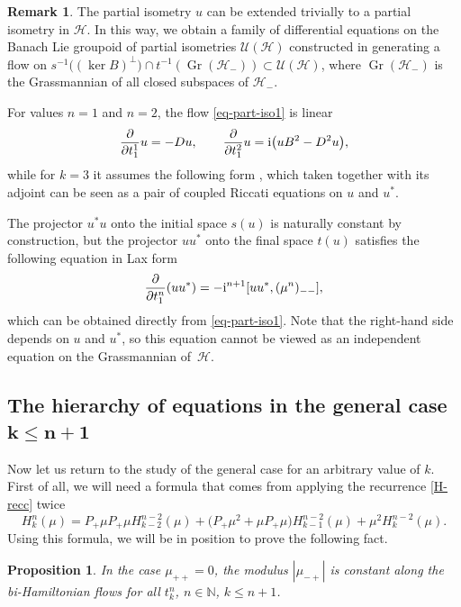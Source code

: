 \documentclass[10pt,a4paper]{amsart}
\newtheorem{prop}[thm]{Proposition}
\theoremstyle{definition}
\newtheorem{rem}[thm]{Remark}
\numberwithin{equation}{section}
\newcommand{\N}{\mathbb N}
\renewcommand{\H}{\mathcal{H}}
\newcommand{\UU}{\mathcal U(\H)}
\newcommand{\abs}[1]{\left\vert#1\right\vert}
\newcommand{\be}{\begin{equation}}
\newcommand{\ee}{\end{equation}}
\begin{document}
\begin{rem}
 The partial isometry $u$ can be extended trivially to a partial isometry in $\H$. In this way, we obtain a family of differential equations on the Banach Lie groupoid of partial isometries $\UU$ constructed in \cite{OS} generating a flow on
$s^{-1}\bigl((\ker B)^\perp\bigr)\cap t^{-1}(\operatorname{Gr}(\H_-))\subset \UU$, where $\operatorname{Gr}(\H_-)$ is the Grassmannian of all closed subspaces of $\H_-$.
\end{rem}
For values $n=1$ and $n=2$, the flow \eqref{eq-part-iso1} is linear
\begin{gather*} \frac\partial{\partial t^1_1} u = -Du,\qquad
\frac\partial{\partial t^2_1} u = {\rm i}\bigl(uB^2-D^2u\bigr),
\end{gather*}
while for $k=3$ it assumes the following form
,
which taken together with its adjoint can be seen as a pair of coupled Riccati equations on $u$ and $u^*$.

The projector $u^*u$ onto the initial space $s(u)$ is naturally constant by construction, but the projector $uu^*$ onto the final space $t(u)$ satisfies the following equation in Lax form
\[
\frac\partial{\partial t^n_1} (uu^*) = -{\rm i}^{n+1} [uu^*,(\mu^{n})_{--}],
\]
which can be obtained directly from \eqref{eq-part-iso1}.
Note that the right-hand side depends on $u$ and $u^*$, so this equation cannot be viewed as an independent equation on the Grassmannian of~$\H$.

\subsection[The hierarchy of equations in the general case k<= n+1]{The hierarchy of equations in the general case $\boldsymbol{k\leq n+1}$}

Now let us return to the study of the general case for an arbitrary value of $k$. First of all, we will need a formula that comes from applying the recurrence \eqref{H-recc} twice
\be \label{H-recc2}H^n_k(\mu)= P_+\mu P_+ \mu H^{n-2}_{k-2}(\mu) +
\bigl(P_+\mu^2 + \mu P_+ \mu \bigr) H^{n-2}_{k-1}(\mu) + \mu^2 H^{n-2}_{k}(\mu).\ee
Using this formula, we will be in position to prove the following fact.

\begin{prop}
In the case $\mu_{++}=0$, the modulus $\abs{\mu_{-+}}$ is constant along the bi-Hamiltonian flows for all $t^n_k$, $n\in \N$, $k\leq n+1$.
\end{prop}
\end{document}
